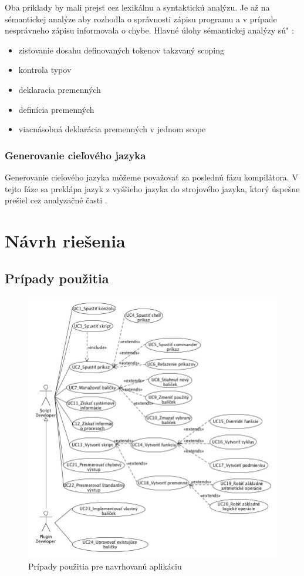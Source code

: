 Oba príklady by mali prejsť cez lexikálnu a syntaktickú analýzu. Je až na sémantickej analýze aby rozhodla o správnosti zápisu programu a v prípade nesprávneho zápisu informovala o chybe.  Hlavné úlohy sémantickej analýzy sú" :

\begin{itemize}
	\item zisťovanie dosahu definovaných tokenov takzvaný scoping
	\item kontrola typov
	\item deklaracia premenných
	\item definícia premenných
	\item viacnásobná deklarácia premenných v jednom scope
\end{itemize}

\subsubsection{Generovanie cieľového jazyka}
\indent Generovanie cieľového jazyka môžeme považovať za poslednú fázu kompilátora. V tejto fáze sa preklápa jazyk z vyššieho jazyka do strojového jazyka, ktorý úspešne prešiel cez analyzačné časti .\cite{gram}

\section{Návrh riešenia}
\subsection{Prípady použitia}
\begin{figure}[!htbp]
	\centering
	\includegraphics[width=\linewidth]{img/usecase.jpg}
	\caption{Prípady použitia pre navrhovanú aplikáciu}
	\label{fig:test}
\end{figure}
\newpage
